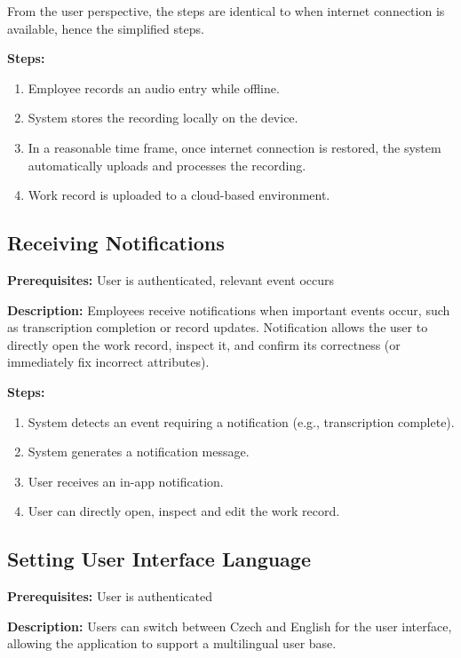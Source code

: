\documentclass[
  digital,     %
  oneside,     %
  nosansbold,  %
  nocolorbold, %
  lof,         %
  lot,         %
]{fithesis4}
\begin{document}
From the user perspective, the steps are identical to when internet connection is available, hence the simplified steps.

\noindent \textbf{Steps:}
\begin{enumerate}
    \item Employee records an audio entry while offline.
    \item System stores the recording locally on the device.
    \item In a reasonable time frame, once internet connection is restored, the system automatically uploads and processes the recording.
    \item Work record is uploaded to a cloud-based environment.
\end{enumerate}

\subsection{Receiving Notifications}

\noindent \textbf{Prerequisites:} User is authenticated, relevant event occurs

\noindent \textbf{Description:}  
Employees receive notifications when important events occur, such as transcription completion or record updates. Notification allows the user to directly open the work record, inspect it, and confirm its correctness (or immediately fix incorrect attributes).

\noindent \textbf{Steps:}
\begin{enumerate}
    \item System detects an event requiring a notification (e.g., transcription complete).
    \item System generates a notification message.
    \item User receives an in-app notification.
    \item User can directly open, inspect and edit the work record.
\end{enumerate}

\subsection{Setting User Interface Language}

\noindent \textbf{Prerequisites:} User is authenticated

\noindent \textbf{Description:}  
Users can switch between Czech and English for the user interface, allowing the application to support a multilingual user base.
\end{document}
